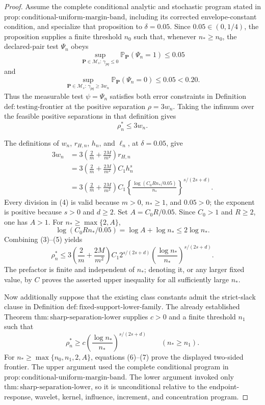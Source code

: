 \documentclass{article}
\begin{document}
\begin{proof}
Assume the complete conditional analytic and stochastic program stated in \(\mathrm{prop:conditional\text{-}uniform\text{-}margin\text{-}band}\), including its corrected envelope-constant condition, and specialize that proposition to \(\delta=0.05\).  Since \(0.05\in(0,1/4)\), the proposition supplies a finite threshold \(n_0\) such that, whenever \(n_\ast\ge n_0\), the declared-pair test \(\Psi_n\) obeys
\[
 \sup_{\mathbf P\in\mathcal M_s:\,\gamma_{pq}\le0}
 \mathbb P_{\mathbf P}(\Psi_n=1)\le0.05
 \tag{1}
\]
and
\[
 \sup_{\mathbf P\in\mathcal M_s:\,\gamma_{pq}\ge3w_n}
 \mathbb P_{\mathbf P}(\Psi_n=0)\le0.05<0.20.
 \tag{2}
\]
Thus the measurable test \(\psi=\Psi_n\) satisfies both error constraints in Definition \(\mathrm{def:testing\text{-}frontier}\) at the positive separation \(\rho=3w_n\).  Taking the infimum over the feasible positive separations in that definition gives
\[
 \rho_n^\ast\le3w_n.
 \tag{3}
\]

The definitions of \(w_n\), \(r_{H,n}\), \(h_n\), and \(\ell_n\), at \(\delta=0.05\), give
\[
\begin{aligned}
 3w_n
 &=3\left(\frac2m+\frac{2M}{m^2}\right)r_{H,n}\\
 &=3\left(\frac2m+\frac{2M}{m^2}\right)C_1h_n^s\\
 &=3\left(\frac2m+\frac{2M}{m^2}\right)C_1
 \left\{\frac{\log(C_0Rn_\ast/0.05)}{n_\ast}\right\}^{s/(2s+d)}.
\end{aligned}
 \tag{4}
\]
Every division in (4) is valid because \(m>0\), \(n_\ast\ge1\), and \(0.05>0\); the exponent is positive because \(s>0\) and \(d\ge2\).  Set \(A=C_0R/0.05\).  Since \(C_0>1\) and \(R\ge2\), one has \(A>1\).  For \(n_\ast\ge\max\{2,A\}\),
\[
 \log(C_0Rn_\ast/0.05)=\log A+\log n_\ast\le2\log n_\ast.
 \tag{5}
\]
Combining (3)--(5) yields
\[
 \rho_n^\ast
 \le
 3\left(\frac2m+\frac{2M}{m^2}\right)C_1
 2^{s/(2s+d)}
 \left(\frac{\log n_\ast}{n_\ast}\right)^{s/(2s+d)}.
 \tag{6}
\]
The prefactor is finite and independent of \(n_\ast\); denoting it, or any larger fixed value, by \(C\) proves the asserted upper inequality for all sufficiently large \(n_\ast\).

Now additionally suppose that the existing class constants admit the strict-slack clause in Definition \(\mathrm{def:fixed\text{-}support\text{-}lower\text{-}family}\).  The already established Theorem \(\mathrm{thm:sharp\text{-}separation\text{-}lower}\) supplies \(c>0\) and a finite threshold \(n_1\) such that
\[
 \rho_n^\ast\ge c
 \left(\frac{\log n_\ast}{n_\ast}\right)^{s/(2s+d)}
 \qquad(n_\ast\ge n_1).
 \tag{7}
\]
For \(n_\ast\ge\max\{n_0,n_1,2,A\}\), equations (6)--(7) prove the displayed two-sided frontier.  The upper argument used the complete conditional program in \(\mathrm{prop:conditional\text{-}uniform\text{-}margin\text{-}band}\).  The lower argument invoked only \(\mathrm{thm:sharp\text{-}separation\text{-}lower}\), so it is unconditional relative to the endpoint-response, wavelet, kernel, influence, increment, and concentration program.
\end{proof}
\end{document}
